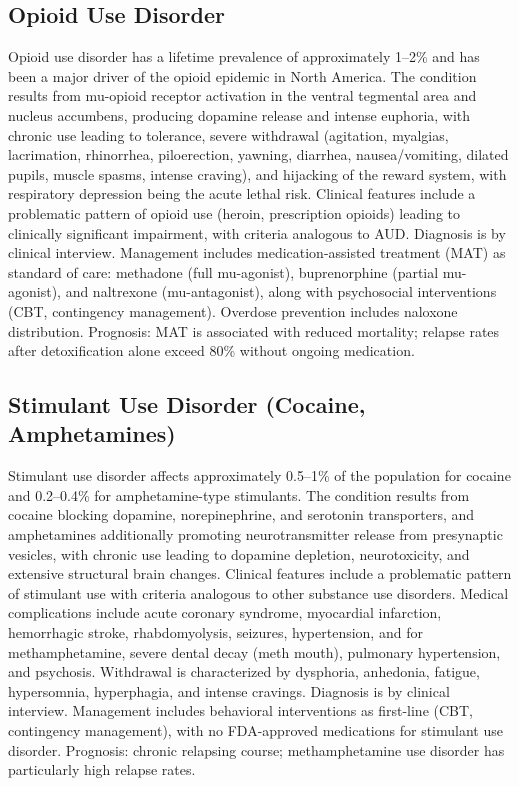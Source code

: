 \subsection{Opioid Use Disorder}
\label{sec:Opioid Use Disorder}
Opioid use disorder has a lifetime prevalence of approximately 1--2\% and has been a major driver of the opioid epidemic in North America. The condition results from mu-opioid receptor activation in the ventral tegmental area and nucleus accumbens, producing dopamine release and intense euphoria, with chronic use leading to tolerance, severe withdrawal (agitation, myalgias, lacrimation, rhinorrhea, piloerection, yawning, diarrhea, nausea/vomiting, dilated pupils, muscle spasms, intense craving), and hijacking of the reward system, with respiratory depression being the acute lethal risk. Clinical features include a problematic pattern of opioid use (heroin, prescription opioids) leading to clinically significant impairment, with criteria analogous to AUD. Diagnosis is by clinical interview. Management includes medication-assisted treatment (MAT) as standard of care: methadone (full mu-agonist), buprenorphine (partial mu-agonist), and naltrexone (mu-antagonist), along with psychosocial interventions (CBT, contingency management). Overdose prevention includes naloxone distribution. Prognosis: MAT is associated with reduced mortality; relapse rates after detoxification alone exceed 80\% without ongoing medication.

\subsection{Stimulant Use Disorder (Cocaine, Amphetamines)}
\label{sec:Stimulant Use Disorder (Cocaine, Amphetamines)}
Stimulant use disorder affects approximately 0.5--1\% of the population for cocaine and 0.2--0.4\% for amphetamine-type stimulants. The condition results from cocaine blocking dopamine, norepinephrine, and serotonin transporters, and amphetamines additionally promoting neurotransmitter release from presynaptic vesicles, with chronic use leading to dopamine depletion, neurotoxicity, and extensive structural brain changes. Clinical features include a problematic pattern of stimulant use with criteria analogous to other substance use disorders. Medical complications include acute coronary syndrome, myocardial infarction, hemorrhagic stroke, rhabdomyolysis, seizures, hypertension, and for methamphetamine, severe dental decay (meth mouth), pulmonary hypertension, and psychosis. Withdrawal is characterized by dysphoria, anhedonia, fatigue, hypersomnia, hyperphagia, and intense cravings. Diagnosis is by clinical interview. Management includes behavioral interventions as first-line (CBT, contingency management), with no FDA-approved medications for stimulant use disorder. Prognosis: chronic relapsing course; methamphetamine use disorder has particularly high relapse rates.

